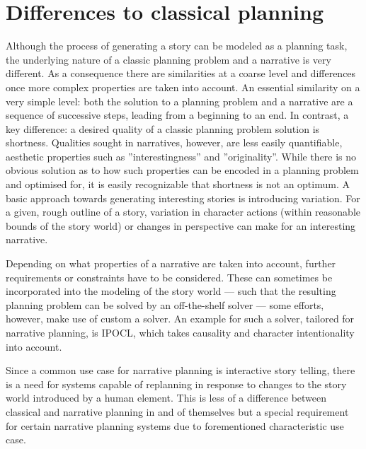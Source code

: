 \section{Differences to classical planning}\label{differences}
Although the process of generating a story can be modeled as a planning task, the underlying nature of a classic planning problem and a narrative is very different. As a consequence there are similarities at a coarse level and differences once more complex properties are taken into account. An essential similarity on a very simple level: both the solution to a planning problem and a narrative are a sequence of successive steps, leading from a beginning to an end. In contrast, a key difference: a desired quality of a classic planning problem solution is shortness. Qualities sought in narratives, however, are less easily quantifiable, aesthetic properties such as ''interestingness'' and ''originality''. While there is no obvious solution as to how such properties can be encoded in a planning problem and optimised for, it is easily recognizable that shortness is not an optimum. A basic approach towards generating interesting stories is introducing variation. For a given, rough outline of a story, variation in character actions (within reasonable bounds of the story world) or changes in perspective can make for an interesting narrative.

Depending on what properties of a narrative are taken into account, further requirements or constraints have to be considered. These can sometimes be incorporated into the modeling of the story world --- such that the resulting planning problem can be solved by an off-the-shelf solver --- some efforts, however, make use of custom a solver. An example for such a solver, tailored for narrative planning, is IPOCL\cite{Riedl04}, which takes causality and character intentionality into account.

Since a common use case for narrative planning is interactive story telling, there is a need for systems capable of replanning in response to changes to the story world introduced by a human element. This is less of a difference between classical and narrative planning in and of themselves but a special requirement for certain narrative planning systems due to forementioned characteristic use case.
%
%
%
